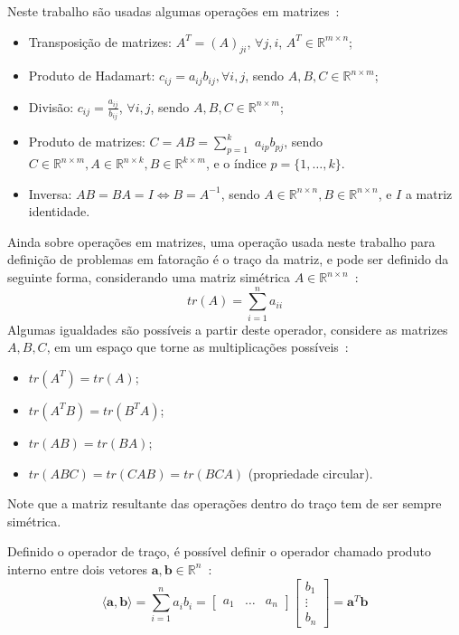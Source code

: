 \documentclass[
    12pt,                %
    oneside,            %
    a4paper,            %
    english,            %
    brazil                %
    ]{abntex2ppgsi}
\begin{document}
Neste trabalho são usadas algumas operações em matrizes~\cite{Golub1996}:
\begin{itemize}
    \item Transposição de matrizes: $A^T = (A)_{ji}$, $\forall j, i$, $A^T \in \mathbb{R}^{m \times n}$;
    \item Produto de Hadamart: $c_{ij} = a_{ij} b_{ij}, \forall i, j$, sendo $A, B, C \in \mathbb{R}^{n \times m}$;
    \item Divisão: $c_{ij} = \frac{a_{ij}}{b_{ij}}$, $\forall i, j$, sendo $A, B, C \in \mathbb{R}^{n \times m}$;
    \item Produto de matrizes: $C = AB = \sum_{p = 1}^k$ $a_{ip} b_{pj}$, sendo $C \in \mathbb{R}^{n \times m}, A \in \mathbb{R}^{n \times k}, B \in \mathbb{R}^{k \times m}$, e o índice $p = \{1, \dots, k\}$.
    \item Inversa: $AB = BA = I \Leftrightarrow B = A^{-1}$, sendo $A \in \mathbb{R}^{n \times n}, B \in \mathbb{R}^{n \times n}$, e $I$ a matriz identidade.
\end{itemize}

Ainda sobre operações em matrizes, uma operação usada neste trabalho para definição de problemas em fatoração é o traço da matriz, e pode ser definido da seguinte forma, considerando uma matriz simétrica $A \in \mathbb{R}^{n \times n}$~\cite{Magnus1999}:
\[
    tr(A) = \sum_{i=1}^n a_{ii}
\]
Algumas igualdades são possíveis a partir deste operador, considere as matrizes $A, B, C$, em um espaço que torne as multiplicações possíveis~\cite{Magnus1999}:
\begin{itemize}
    \item $tr(A^T) = tr(A)$;
    \item $tr(A^TB) = tr(B^TA)$;
    \item $tr(AB) = tr(BA)$;
    \item $tr(ABC) = tr(CAB) = tr(BCA)$ (propriedade circular).
\end{itemize}
Note que a matriz resultante das operações dentro do traço tem de ser sempre simétrica.

Definido o operador de traço, é possível definir o operador chamado produto interno entre dois vetores $\mathbf{a}, \mathbf{b} \in \mathbb{R}^n$~\cite{Boyd2004}:
\[
    \langle \mathbf{a}, \mathbf{b} \rangle = \sum_{i=1}^n a_i b_i = \begin{bmatrix}
                                                                        a_{1} & \dots & a_{n}
                                                                    \end{bmatrix}
                                                                    \begin{bmatrix}
                                                                        b_{1}  \\
                                                                        \vdots \\
                                                                        b_{n}
                                                                    \end{bmatrix}
                                                                  = \mathbf{a}^T \mathbf{b}
\]
\end{document}

